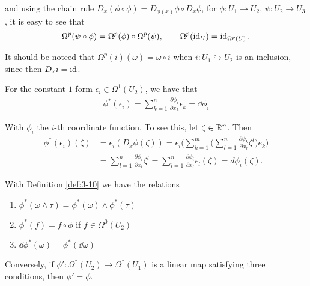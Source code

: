 and using the chain rule $D_x(\phi\circ\phi) = D_{\phi(x)}\phi\circ D_x\phi$, for $\phi:U_1\to U_2$, 
$\psi:U_2\to U_3$, it is easy to see that 
\begin{align*}
  \Omega^p(\psi\circ\phi) = \Omega^p(\phi)\circ\Omega^p(\psi),\qquad 
  \Omega^p(\operatorname{id}_U) = \operatorname{id}_{\Omega^p(U)}.
\end{align*}

It should be noteed that $\Omega^p(i)(\omega) = \omega\circ i$ when $i:U_1\hookrightarrow U_2$ is an inclusion, since 
then $D_xi = \operatorname{id}$.

\begin{example}\label{example:3-11}
  For the constant $1$-form $\epsilon_i\in\Omega^1(U_2)$, we have that
  \begin{align*}
    \phi^*(\epsilon_i) 
    = \sum_{k=1}^{n }{\frac{\partial \phi_i }{\partial x_k }\epsilon_k} 
    = \dd\phi_i
  \end{align*}
\end{example}

With $\phi_i$ the $i$-th coordinate function. To see this, let $\zeta\in\mathbb{R}^n$. Then 
\begin{align*}
  \phi^{*}(\epsilon_{i})(\zeta)
  & = \epsilon_{i}(D_{x}\phi(\zeta))
      = \epsilon_{i}\Bigg(\sum_{k=1}^{m}\Big(\sum_{l=1}^{n}\frac{\partial\phi_{k}}{\partial x_{l}}\zeta^{l}\Big)e_{k}\Bigg) \\
  & = \sum_{l=1}^{n}\frac{\partial\phi_{i}}{\partial x_{l}}\zeta^{l}
      =\sum_{l=1}^{n}\frac{\partial\phi_{i}}{\partial x_{l}}\epsilon_{l}(\zeta)=d\phi_{i}(\zeta).
\end{align*}

\begin{theorem}\label{theorem:3-12}
With Definition \ref{def:3-10} we have the relations
\begin{enumerate}[label=(\roman*)]
  \item $\phi^*(\omega\wedge\tau) = \phi^*(\omega)\wedge\phi^*(\tau)$
  \item $\phi^*(f) = f\circ\phi$ if $f\in\Omega^0(U_2)$
  \item $\dd\phi^*(\omega) = \phi^*(\dd\omega)$
\end{enumerate}

Conversely, if $\phi':\Omega^*(U_2)\to\Omega^*(U_1)$ is a linear map satisfying three conditions, then $\phi'=\phi$.
\end{theorem}

